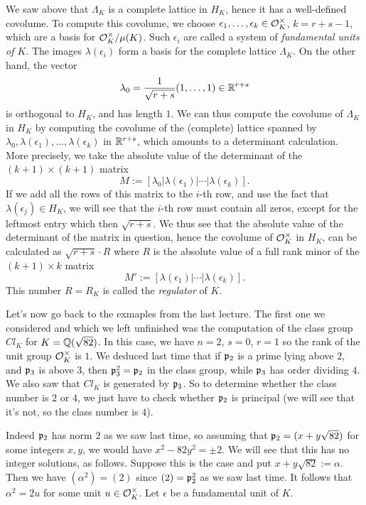 We saw above that $\Lambda_{K}$ is a complete lattice in $H_{K}$, hence it has a well-defined covolume.
To compute this covolume, we choose $\epsilon_{1},\ldots,\epsilon_{k} \in \mathcal{O}_{K}^{\times}$, $k = r+s-1$, which are a basis for $\mathcal{O}_{K}^{\times}/\mu(K)$.
Such $\epsilon_{i}$ are called a system of \emph{fundamental units of $K$}.
The images $\lambda(\epsilon_{i})$ form a basis for the complete lattice $\Lambda_{K}$.
On the other hand, the vector
\[ \lambda_{0} = \frac{1}{\sqrt{r+s}}(1,\ldots,1) \in \mathbb{R}^{r+s} \]
is orthogonal to $H_{K}$, and has length $1$.
We can thus compute the covolume of $\Lambda_{K}$ in $H_{K}$ by computing the covolume of the (complete) lattice spanned by $\lambda_{0},\lambda(\epsilon_{1}),\ldots,\lambda(\epsilon_{k})$ in $\mathbb{R}^{r+s}$, which amounts to a determinant calculation.
More precisely, we take the absolute value of the determinant of the $(k+1)\times(k+1)$ matrix
\[ M := [\lambda_{0}|\lambda(\epsilon_{1})|\cdots|\lambda(\epsilon_{k})]. \]
If we add all the rows of this matrix to the $i$-th row, and use the fact that $\lambda(\epsilon_{j}) \in H_{K}$, we will see that the $i$-th row must contain all zeros, except for the leftmost entry which then  $\sqrt{r+s}$.
We thus see that the absolute value of the determinant of the matrix in question, hence the covolume of $\mathcal{O}_{K}^{\times}$ in $H_{K}$, can be calculated as $\sqrt{r+s} \cdot R$ where $R$ is the absolute value of a full rank minor of the $(k+1) \times k$ matrix
\[ M' := [\lambda(\epsilon_{1})|\cdots|\lambda(\epsilon_{k})]. \]
This number $R = R_{K}$ is called the \emph{regulator} of $K$.

Let's now go back to the exmaples from the last lecture.
The first one we considered and which we left unfinished was the computation of the class group $Cl_{K}$ for $K = \mathbb{Q}(\sqrt{82})$.
In this case, we have $n = 2$, $s = 0$, $r = 1$ so the rank of the unit group $\mathcal{O}_{K}^{\times}$ is $1$.
We deduced last time that if $\mathfrak{p}_{2}$ is a prime lying above $2$, and $\mathfrak{p}_{3}$ is above $3$, then $\mathfrak{p}_{3}^{2} = \mathfrak{p}_{2}$ in the class group, while $\mathfrak{p}_{3}$ has order dividing $4$.
We also saw that $Cl_{K}$ is generated by $\mathfrak{p}_{3}$.
So to determine whether the class number is $2$ or $4$, we just have to check whether $\mathfrak{p}_{2}$ is principal (we will see that it's not, so the class number is $4$).

Indeed $\mathfrak{p}_{2}$ has norm $2$ as we saw last time, so assuming that $\mathfrak{p}_{2} = (x + y\sqrt{82})$ for some integers $x,y$, we would have $x^{2} - 82y^{2} = \pm 2$.
We will see that this has no integer solutions, as follows.
Suppose this is the case and put $x + y \sqrt{82} := \alpha$.
Then we have $(\alpha^{2}) = (2)$ since $(2) = \mathfrak{p}_{2}^{2}$ as we saw last time.
It follows that $\alpha^{2} = 2u$ for some unit $u \in \mathcal{O}_{K}^{\times}$.
Let $\epsilon$ be a fundamental unit of $K$.

